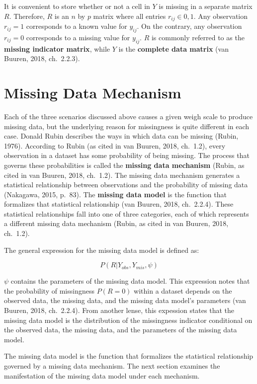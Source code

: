 \documentclass[12pt,oneside]{chicagocapstone}
\begin{document}
It is convenient to store whether or not a cell in \(Y\) is missing in a
separate matrix \(R\). Therefore, \(R\) is an \(n\) by \(p\) matrix
where all entries \(r_{ij} \in {0, 1}\). Any observation \(r_{ij}=1\)
corresponds to a known value for \(y_{ij}\). On the contrary, any
observation \(r_{ij}=0\) corresponds to a missing value for \(y_{ij}\).
\(R\) is commonly referred to as the \textbf{missing indicator matrix},
while \(Y\) is the \textbf{complete data matrix} (van Buuren, 2018,
ch.~2.2.3).

\section*{Missing Data Mechanism}\label{background-missing-data-mech}

Each of the three scenarios discussed above causes a given weigh scale
to produce missing data, but the underlying reason for missingness is
quite different in each case. Donald Rubin describes the ways in which
data can be missing (Rubin, 1976). According to Rubin (as cited in van
Buuren, 2018, ch.~1.2), every observation in a dataset has some
probability of being missing. The process that governs these
probabilities is called the \textbf{missing data mechanism} (Rubin, as
cited in van Buuren, 2018, ch.~1.2). The missing data mechanism
generates a statistical relationship between observations and the
probability of missing data (Nakagawa, 2015, p.~83). The \textbf{missing
data model} is the function that formalizes that statistical
relationship (van Buuren, 2018, ch.~2.2.4). These statistical
relationships fall into one of three categories, each of which
represents a different missing data mechanism (Rubin, as cited in van
Buuren, 2018, ch.~1.2).

The general expression for the missing data model is defined as:

\[P(R|Y_{obs}, Y_{mis},\psi)\]

\(\psi\) contains the parameters of the missing data model. This
expression notes that the probability of missingness \(P(R=0)\) within a
dataset depends on the observed data, the missing data, and the missing
data model's parameters (van Buuren, 2018, ch.~2.2.4). From another
lense, this expession states that the missing data model is the
distribution of the missingness indicator conditional on the observed
data, the missing data, and the parameters of the missing data model.

The missing data model is the function that formalizes the statistical
relationship governed by a missing data mechanism. The next section
examines the manifestation of the missing data model under each
mechanism.
\end{document}
